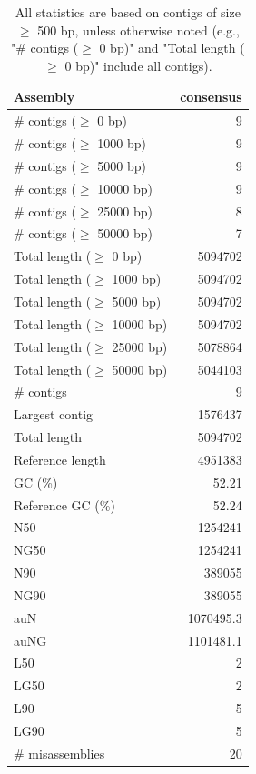 \documentclass[12pt,a4paper]{article}
\begin{document}
\begin{table}[ht]
\begin{center}
\caption{All statistics are based on contigs of size $\geq$ 500 bp, unless otherwise noted (e.g., "\# contigs ($\geq$ 0 bp)" and "Total length ($\geq$ 0 bp)" include all contigs).}
\begin{tabular}{|l*{1}{|r}|}
\hline
Assembly & consensus \\ \hline
\# contigs ($\geq$ 0 bp) & 9 \\ \hline
\# contigs ($\geq$ 1000 bp) & 9 \\ \hline
\# contigs ($\geq$ 5000 bp) & 9 \\ \hline
\# contigs ($\geq$ 10000 bp) & 9 \\ \hline
\# contigs ($\geq$ 25000 bp) & 8 \\ \hline
\# contigs ($\geq$ 50000 bp) & 7 \\ \hline
Total length ($\geq$ 0 bp) & 5094702 \\ \hline
Total length ($\geq$ 1000 bp) & 5094702 \\ \hline
Total length ($\geq$ 5000 bp) & 5094702 \\ \hline
Total length ($\geq$ 10000 bp) & 5094702 \\ \hline
Total length ($\geq$ 25000 bp) & 5078864 \\ \hline
Total length ($\geq$ 50000 bp) & 5044103 \\ \hline
\# contigs & 9 \\ \hline
Largest contig & 1576437 \\ \hline
Total length & 5094702 \\ \hline
Reference length & 4951383 \\ \hline
GC (\%) & 52.21 \\ \hline
Reference GC (\%) & 52.24 \\ \hline
N50 & 1254241 \\ \hline
NG50 & 1254241 \\ \hline
N90 & 389055 \\ \hline
NG90 & 389055 \\ \hline
auN & 1070495.3 \\ \hline
auNG & 1101481.1 \\ \hline
L50 & 2 \\ \hline
LG50 & 2 \\ \hline
L90 & 5 \\ \hline
LG90 & 5 \\ \hline
\# misassemblies & 20 \\ \hline

\end{tabular}
\end{center}
\end{table}
\end{document}

